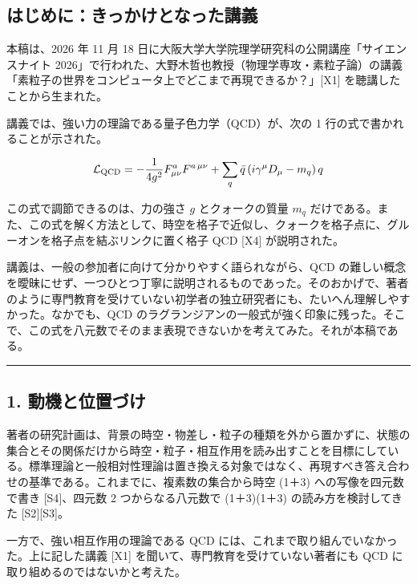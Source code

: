 \documentclass[
  a4paper,
]{ltjsarticle}
\begin{document}
\subsection{はじめに：きっかけとなった講義}\label{ux306fux3058ux3081ux306bux304dux3063ux304bux3051ux3068ux306aux3063ux305fux8b1bux7fa9}

本稿は、2026 年 11 月 18
日に大阪大学大学院理学研究科の公開講座「サイエンスナイト
2026」で行われた、大野木哲也教授（物理学専攻・素粒子論）の講義「素粒子の世界をコンピュータ上でどこまで再現できるか？」{[}X1{]}
を聴講したことから生まれた。

講義では、強い力の理論である量子色力学（QCD）が、次の 1
行の式で書かれることが示された。

\[
\mathcal{L}_{\rm QCD} = -\frac{1}{4g^2}F^a_{\mu\nu}F^{a\,\mu\nu} + \sum_q \bar q\,(i\gamma^\mu D_\mu - m_q)\,q
\]

この式で調節できるのは、力の強さ \(g\) とクォークの質量 \(m_q\)
だけである。また、この式を解く方法として、時空を格子で近似し、クォークを格子点に、グルーオンを格子点を結ぶリンクに置く格子
QCD {[}X4{]} が説明された。

講義は、一般の参加者に向けて分かりやすく語られながら、QCD
の難しい概念を曖昧にせず、一つひとつ丁寧に説明されるものであった。そのおかげで、著者のように専門教育を受けていない初学者の独立研究者にも、たいへん理解しやすかった。なかでも、QCD
のラグランジアンの一般式が強く印象に残った。そこで、この式を八元数でそのまま表現できないかを考えてみた。それが本稿である。

\begin{center}\rule{0.5\linewidth}{0.5pt}\end{center}

\subsection{1.
動機と位置づけ}\label{ux52d5ux6a5fux3068ux4f4dux7f6eux3065ux3051}

著者の研究計画は、背景の時空・物差し・粒子の種類を外から置かずに、状態の集合とその関係だけから時空・粒子・相互作用を読み出すことを目標にしている。標準理論と一般相対性理論は置き換える対象ではなく、再現すべき答え合わせの基準である。これまでに、複素数の集合から時空
(1＋3) への写像を四元数で書き {[}S4{]}、四元数 2 つからなる八元数で
(1＋3)(1＋3) の読み方を検討してきた {[}S2{]}{[}S3{]}。

一方で、強い相互作用の理論である QCD
には、これまで取り組んでいなかった。上に記した講義 {[}X1{]}
を聞いて、専門教育を受けていない著者にも QCD
に取り組めるのではないかと考えた。
\end{document}
